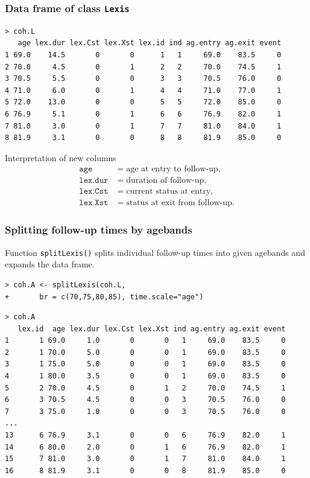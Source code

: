 \documentclass[handout,12pt]{beamer}
\begin{document}
\begin{frame}[fragile]
\frametitle{Data frame of class \texttt{Lexis} }

\scriptsize
\begin{verbatim}
> coh.L
   age lex.dur lex.Cst lex.Xst lex.id ind ag.entry ag.exit event
1 69.0    14.5       0       0      1   1     69.0    83.5     0
2 70.0     4.5       0       1      2   2     70.0    74.5     1
3 70.5     5.5       0       0      3   3     70.5    76.0     0
4 71.0     6.0       0       1      4   4     71.0    77.0     1
5 72.0    13.0       0       0      5   5     72.0    85.0     0
6 76.9     5.1       0       1      6   6     76.9    82.0     1
7 81.0     3.0       0       1      7   7     81.0    84.0     1
8 81.9     3.1       0       0      8   8     81.9    85.0     0
\end{verbatim}
\normalsize
Interpretation of new columns
\begin{align*}
 \texttt{age} & =  \text{age at entry to follow-up},\\
 \texttt{lex.dur} & =  \text{duration of follow-up},\\
 \texttt{lex.Cst} & =  \text{current status at entry}, \\
  \texttt{lex.Xst} & =  \text{status at exit from follow-up}.
\end{align*}

\end{frame}

\begin{frame}[fragile]
\frametitle{Splitting follow-up times by agebands}

\medskip
Function \texttt{splitLexis()} splits individual follow-up times
into given agebands and expands the data frame.
\small
\begin{verbatim}
> coh.A <- splitLexis(coh.L, 
+       br = c(70,75,80,85), time.scale="age")
\end{verbatim}
\scriptsize
\begin{verbatim}
> coh.A
   lex.id  age lex.dur lex.Cst lex.Xst ind ag.entry ag.exit event
1       1 69.0     1.0       0       0   1     69.0    83.5     0
2       1 70.0     5.0       0       0   1     69.0    83.5     0
3       1 75.0     5.0       0       0   1     69.0    83.5     0
4       1 80.0     3.5       0       0   1     69.0    83.5     0
5       2 70.0     4.5       0       1   2     70.0    74.5     1
6       3 70.5     4.5       0       0   3     70.5    76.0     0
7       3 75.0     1.0       0       0   3     70.5    76.0     0
...
13      6 76.9     3.1       0       0   6     76.9    82.0     1
14      6 80.0     2.0       0       1   6     76.9    82.0     1
15      7 81.0     3.0       0       1   7     81.0    84.0     1
16      8 81.9     3.1       0       0   8     81.9    85.0     0
\end{verbatim}

\normalsize

\end{frame}
\end{document}
